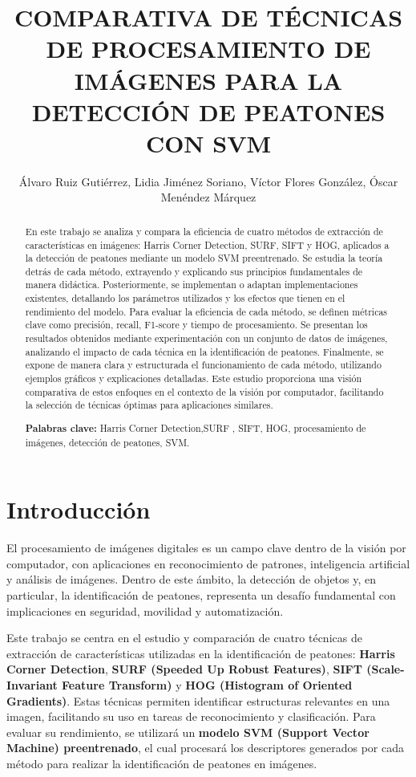 \documentclass[a4paper]{article}
\title{COMPARATIVA DE TÉCNICAS DE PROCESAMIENTO DE IMÁGENES PARA LA DETECCIÓN DE PEATONES CON SVM}
\author{Álvaro Ruiz Gutiérrez, Lidia Jiménez Soriano, Víctor Flores González, Óscar Menéndez Márquez}
\begin{document}
\maketitle

\begin{abstract}
  \noindent En este trabajo se analiza y compara la eficiencia de cuatro métodos de extracción de características en imágenes: Harris Corner Detection, SURF, SIFT y HOG, aplicados a la detección de peatones mediante un modelo SVM preentrenado. Se estudia la teoría detrás de cada método, extrayendo y explicando sus principios fundamentales de manera didáctica. Posteriormente, se implementan o adaptan implementaciones existentes, detallando los parámetros utilizados y los efectos que tienen en el rendimiento del modelo. Para evaluar la eficiencia de cada método, se definen métricas clave como precisión, recall, F1-score y tiempo de procesamiento. Se presentan los resultados obtenidos mediante experimentación con un conjunto de datos de imágenes, analizando el impacto de cada técnica en la identificación de peatones. Finalmente, se expone de manera clara y estructurada el funcionamiento de cada método, utilizando ejemplos gráficos y explicaciones detalladas. Este estudio proporciona una visión comparativa de estos enfoques en el contexto de la visión por computador, facilitando la selección de técnicas óptimas para aplicaciones similares.  
 
 \hspace{1cm}
 
 \noindent \textbf{Palabras clave:} 
 Harris Corner Detection,SURF , SIFT, HOG, procesamiento de imágenes, detección de peatones, SVM.
 \end{abstract}
 


 \section{Introducción}

 El procesamiento de imágenes digitales es un campo clave dentro de la visión por computador, con aplicaciones en reconocimiento de patrones, inteligencia artificial y análisis de imágenes. Dentro de este ámbito, la detección de objetos y, en particular, la identificación de peatones, representa un desafío fundamental con implicaciones en seguridad, movilidad y automatización. 
 
 Este trabajo se centra en el estudio y comparación de cuatro técnicas de extracción de características utilizadas en la identificación de peatones: \textbf{Harris Corner Detection}, \textbf{SURF (Speeded Up Robust Features)}, \textbf{SIFT (Scale-Invariant Feature Transform)} y \textbf{HOG (Histogram of Oriented Gradients)}. Estas técnicas permiten identificar estructuras relevantes en una imagen, facilitando su uso en tareas de reconocimiento y clasificación. Para evaluar su rendimiento, se utilizará un \textbf{modelo SVM (Support Vector Machine) preentrenado}, el cual procesará los descriptores generados por cada método para realizar la identificación de peatones en imágenes. 
 
\end{document}
